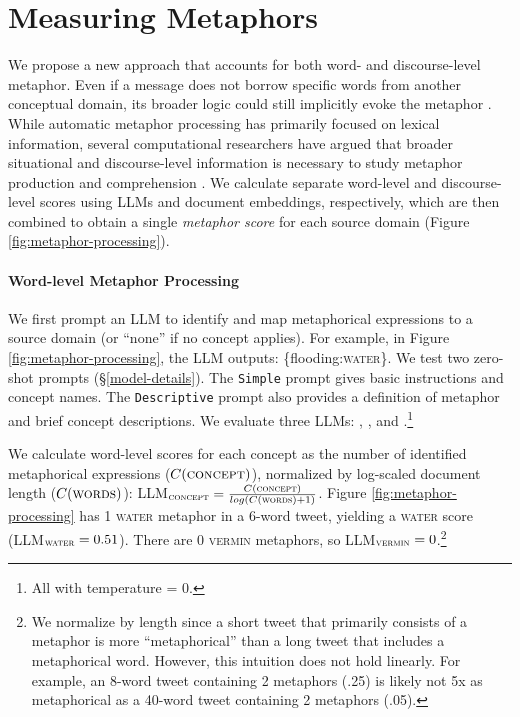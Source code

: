 

\section{Measuring Metaphors}

We propose a new approach that accounts for both word- and discourse-level metaphor. Even if a message does not borrow specific words from another conceptual domain, its broader logic could still implicitly evoke the metaphor \citep{brugman_metaphorical_2019}. While automatic metaphor processing has primarily focused on lexical information, several computational researchers have argued that broader situational and discourse-level information is necessary to study metaphor production and comprehension \citep{mu2019learning,dankers_being_2020}. We calculate separate word-level and discourse-level scores using LLMs and document embeddings, respectively, which are then combined to obtain a single \textit{metaphor score} for each source domain (Figure \ref{fig:metaphor-processing}).




\paragraph{Word-level Metaphor Processing}



We first prompt an LLM to identify and map metaphorical expressions to a source domain (or ``none'' if no concept applies). For example, in Figure \ref{fig:metaphor-processing}, the LLM outputs: \{flooding:\textsc{water}\}. We test two zero-shot prompts (§\ref{model-details}). The \texttt{Simple} prompt gives basic instructions and concept names. The \texttt{Descriptive} prompt also provides a definition of metaphor and brief concept descriptions. We evaluate three LLMs: , , and .\footnote{All with temperature = 0.}



We calculate word-level scores for each concept as the number of identified metaphorical expressions ($C(\textsc{concept})$), normalized by log-scaled document length ($C(\textsc{words})$): LLM$_{\textsc{concept}} = \frac{C(\textsc{concept})}{log(C(\textsc{words})+1)}$. Figure \ref{fig:metaphor-processing} has 1 \textsc{water} metaphor in a 6-word tweet, yielding a \textsc{water} score (LLM$_{\textsc{water}}=0.51$). There are 0 \textsc{vermin} metaphors, so LLM$_{\textsc{vermin}}=0$.\footnote{We normalize by length since a short tweet that primarily consists of a metaphor is more ``metaphorical'' than a long tweet that includes a metaphorical word. However, this intuition does not hold linearly. For example, an 8-word tweet containing 2 metaphors (.25) is likely not 5x as  metaphorical as a 40-word tweet containing 2 metaphors (.05).}

